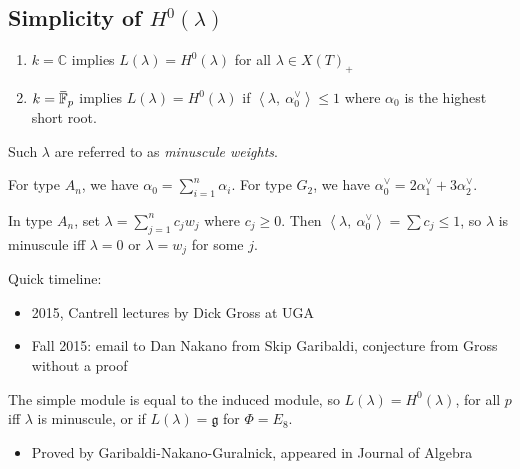 \hypertarget{simplicity-of-h0lambda}{%
\subsection{\texorpdfstring{Simplicity of
\(H^0(\lambda)\)}{Simplicity of H\^{}0(\textbackslash lambda)}}\label{simplicity-of-h0lambda}}

\begin{enumerate}
\def\labelenumi{\arabic{enumi}.}
\item
  \(k = {\mathbb{C}}\) implies \(L(\lambda) = H^0(\lambda)\) for all
  \(\lambda \in X(T)_+\)
\item
  \(k= \mkern 1.5mu\overline{\mkern-1.5mu{\mathbb{F}}\mkern-1.5mu}\mkern 1.5mu_p\)
  implies \(L(\lambda) = H^0(\lambda)\) if
  \({\left\langle {\lambda},~{\alpha_0^\vee} \right\rangle} \leq 1\)
  where \(\alpha_0\) is the highest short root.
\end{enumerate}

Such \(\lambda\) are referred to as \emph{minuscule weights}.

\begin{example}

For type \(A_n\), we have \(\alpha_0 = \sum_{i=1}^n \alpha_i\). For type
\(G_2\), we have \(\alpha_0^\vee= 2\alpha_1^\vee+ 3\alpha_2^\vee\).

\end{example}

\begin{example}

In type \(A_n\), set \(\lambda = \sum_{j=1}^n c_j w_j\) where
\(c_j \geq 0\). Then
\({\left\langle {\lambda},~{\alpha_0^\vee} \right\rangle} = \sum c_j \leq 1\),
so \(\lambda\) is minuscule iff \(\lambda = 0\) or \(\lambda = w_j\) for
some \(j\).

\end{example}

\begin{remark}

Quick timeline:

\begin{itemize}
\tightlist
\item
  2015, Cantrell lectures by Dick Gross at UGA
\item
  Fall 2015: email to Dan Nakano from Skip Garibaldi, conjecture from
  Gross without a proof
\end{itemize}

\begin{proposition}[Gross]

The simple module is equal to the induced module, so
\(L(\lambda) = H^0(\lambda)\), for all \(p\) iff \(\lambda\) is
minuscule, or if \(L(\lambda) = {\mathfrak{g}}\) for \(\Phi = E_8\).

\end{proposition}

\begin{itemize}
\tightlist
\item
  Proved by Garibaldi-Nakano-Guralnick, appeared in Journal of Algebra
\end{itemize}

\end{remark}

